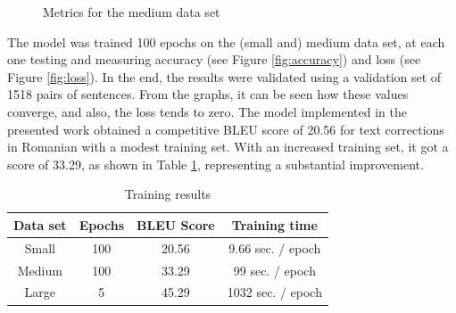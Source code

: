 \documentclass{article}
\begin{document}
        \begin{figure}[h]
            \centering
            \hfill
            \caption{Metrics for the medium data set}
            \label{fig:metrics}
        \end{figure}
        
        The model was trained 100 epochs on the (small and) medium data set, at each one testing and measuring accuracy (see Figure \ref{fig:accuracy}) and loss (see Figure \ref{fig:loss}). In the end, the results were validated using a validation set of 1518 pairs of sentences. From the graphs, it can be seen how these values converge, and also, the loss tends to zero. The model implemented in the presented work obtained a competitive BLEU score of 20.56 for text corrections in Romanian with a modest training set. With an increased training set, it got a score of 33.29, as shown in Table \ref{tab:training-results}, representing a substantial improvement.
        
        \begin{table}[h]
            \caption{Training results}
            \label{tab:training-results}
            \centering
            \begin{tabular}{|c|c|c|c|}
                \hline
                Data set & Epochs & BLEU Score & Training time     \\
                \hline
                Small    & 100    & 20.56      & 9.66 sec. / epoch \\
                \hline
                Medium   & 100    & 33.29      & 99 sec. / epoch   \\
                \hline
                Large    & 5      & 45.29      & 1032 sec. / epoch \\
                \hline
            \end{tabular}
        \end{table}
        
\end{document}
